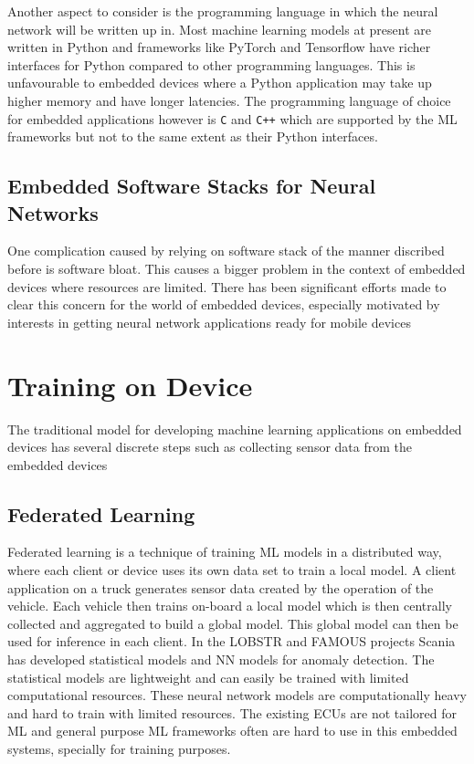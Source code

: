 Another aspect to consider is the programming language in which the neural network will be written up in. Most machine learning models at present are written in Python and frameworks like PyTorch and Tensorflow have richer interfaces for Python compared to other programming languages. This is unfavourable to embedded devices where a Python application may take up higher memory and have longer latencies. The programming language of choice for embedded applications however is \verb!C! and \verb!C++! which are supported by the ML frameworks but not to the same extent as their Python interfaces.

\subsection{Embedded Software Stacks for Neural Networks}

One complication caused by relying on software stack of the manner discribed before is software bloat. This causes a bigger problem in the context of embedded devices where resources are limited. There has been significant efforts made to clear this concern for the world of embedded devices, especially motivated by interests in getting neural network applications ready for mobile devices

\section{Training on Device}

The traditional model for developing machine learning applications on embedded devices has several discrete steps such as collecting sensor data from the embedded devices

\subsection{Federated Learning}

Federated learning is a technique of training ML models in a distributed way, where each client or device uses its own data set to train a local model. A client application on a truck generates sensor data created by the operation of the vehicle. Each vehicle then trains on-board a local model which is then centrally collected and aggregated to build a global model. This global model can then be used for inference in each client. In the LOBSTR \cite{lobstr} and FAMOUS \cite{famous} projects Scania has developed statistical models and NN models for anomaly detection. The statistical models are lightweight and can easily be trained with limited computational resources. These neural network models are computationally heavy and hard to train with limited resources. The existing ECUs are not tailored for ML and general purpose ML frameworks often are hard to use in this embedded systems, specially for training purposes.

